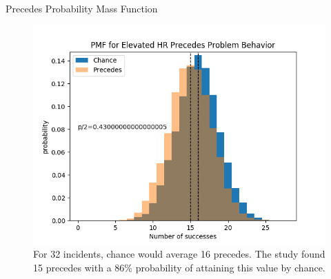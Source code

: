 \documentclass[final]{beamer}
\newlength{\onecolwid}
\newlength{\twocolwid}
\begin{document}
\begin{frame}[t]
\begin{columns}[t]
\begin{column}{\twocolwid}
\begin{columns}[t,totalwidth=\twocolwid]
\begin{column}{\onecolwid}

\begin{block}{Precedes Probability Mass Function}
	
	\begin{figure}
		\includegraphics[width=0.8\linewidth]{Precedes.png}
		\caption{For 32 incidents, chance would average 16 precedes. The study found 15 precedes with a 86\% probability of attaining this value by chance.}
	\end{figure}
	
\end{block}


\end{column} %

\end{columns} %


\begin{columns}[t,totalwidth=\twocolwid] %

\begin{column}{\onecolwid} %


\end{column} %

\begin{column}{\onecolwid} %


\end{column}
\end{columns}
\end{column}
\end{columns}
\end{frame}
\end{document}
